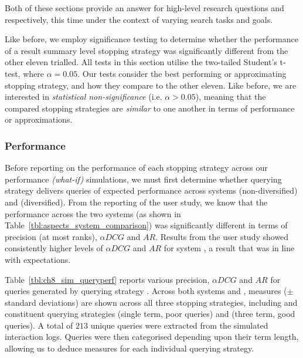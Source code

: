 Both of these sections provide an answer for high-level research questions  and  respectively, this time under the context of varying search tasks and goals.

Like before, we employ significance testing to determine whether the performance of a result summary level stopping strategy was significantly different from the other eleven trialled. All tests in this section utilise the two-tailed Student's t-test, where $\alpha=0.05$. Our tests consider the best performing or approximating stopping strategy, and how they compare to the other eleven. Like before, we are interested in \emph{statistical non-significance} (i.e. $\alpha > 0.05$), meaning that the compared stopping strategies are \emph{similar} to one another in terms of performance or approximations.

\subsubsection{Performance}\label{sec:diversity:simulated:results:perf}
\vspace*{-3mm}
Before reporting on the performance of each stopping strategy across our performance \emph{(what-if)} simulations, we must first determine whether querying strategy  delivers queries of expected performance across systems  (non-diversified) and  (diversified). From the reporting of the user study, we know that the performance across the two systems (as shown in Table~\ref{tbl:aspects_system_comparison}) was significantly different in terms of precision (at most ranks), $\alpha DCG$ and $AR$. Results from the user study showed consistently higher levels of $\alpha DCG$ and $AR$ for system , a result that was in line with expectations.

Table~\ref{tbl:ch8_sim_queryperf} reports various precision, $\alpha DCG$ and $AR$ for queries generated by querying strategy . Across both systems  and , measures ($\pm$ standard deviations) are shown across all three stopping strategies, including  and constituent querying strategies  (single term, poor queries) and  (three term, good queries). A total of $213$ unique queries were extracted from the simulated interaction logs. Queries were then categorised depending upon their term length, allowing us to deduce measures for each individual querying strategy.

